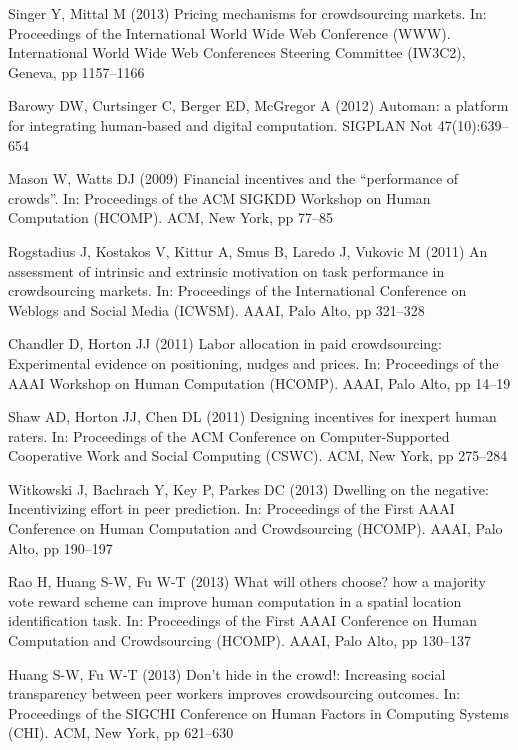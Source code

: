 \documentclass[11pt]{bmc_article_s50}
\begin{document}
\begin{thebibliography}{000}
Singer Y,
Mittal M (2013)
{Pricing mechanisms for crowdsourcing markets}.
In: {Proceedings of the International World Wide Web Conference (WWW)}.
{International World Wide Web Conferences Steering Committee (IW3C2)},
{Geneva},
pp 1157--{1166}



Barowy DW,
Curtsinger C,
Berger ED,
McGregor A (2012)
{Automan: a platform for integrating human-based and digital
  computation}.
{SIGPLAN Not}
{47}(10):639--{654}

Mason W,
Watts DJ (2009)
{Financial incentives and the ``performance of crowds''}.
In: {Proceedings of the ACM SIGKDD Workshop on Human Computation
  (HCOMP)}.
{ACM},
{New York},
pp 77--{85}

Rogstadius J,
Kostakos V,
Kittur A,
Smus B,
Laredo J,
Vukovic M (2011)
{An assessment of intrinsic and extrinsic motivation on task
  performance in crowdsourcing markets}.
In: {Proceedings of the International Conference on Weblogs and Social
  Media (ICWSM)}.
{AAAI},
{Palo Alto},
pp 321--{328}


Chandler D,
Horton JJ (2011)
{Labor allocation in paid crowdsourcing: Experimental evidence on
  positioning, nudges and prices}.
In: {Proceedings of the AAAI Workshop on Human Computation (HCOMP)}.
{AAAI},
{Palo Alto}, pp 14--{19}

Shaw AD,
Horton JJ,
Chen DL (2011)
{Designing incentives for inexpert human raters}.
In: {Proceedings of the ACM Conference on Computer-Supported
  Cooperative Work and Social Computing (CSWC)}.
{ACM},
{New York},
pp 275--{284}


Witkowski J,
Bachrach Y,
Key P,
Parkes DC (2013)
{Dwelling on the negative: Incentivizing effort in peer prediction}.
In: {Proceedings of the First AAAI Conference on Human Computation and
  Crowdsourcing (HCOMP)}.
{AAAI},
{Palo Alto},
pp 190--{197}

Rao H,
Huang S-W,
Fu W-T (2013)
{What will others choose? how a majority vote reward scheme can improve
  human computation in a spatial location identification task}.
In: {Proceedings of the First AAAI Conference on Human Computation and
  Crowdsourcing (HCOMP)}.
{AAAI},
{Palo Alto},
pp 130--{137}

Huang S-W,
Fu W-T (2013)
{Don't hide in the crowd!: Increasing social transparency between peer
  workers improves crowdsourcing outcomes}.
In: {Proceedings of the SIGCHI Conference on Human Factors in Computing
  Systems (CHI)}.
{ACM},
{New York},
pp 621--{630}


\end{thebibliography}
\end{document}
